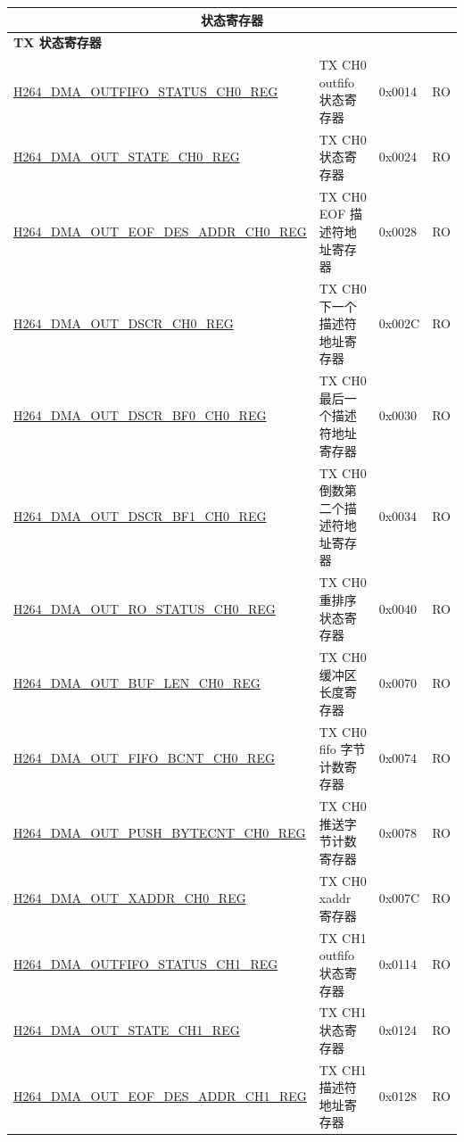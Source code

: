 \begin{longtable}{ | p{7.5cm} | p{5.7cm} | p{1.2cm} | p{1.5cm} | }
\multicolumn{4}{|c|}{\cellcolor{gray!15}\textbf{状态寄存器}} \\ \hline
\multicolumn{4}{|l|}{\textbf{TX 状态寄存器}} \\ \hline
    \hyperref[regdesc:H264DMAOUTFIFOSTATUSCH0REG]{H264\_DMA\_OUTFIFO\_STATUS\_CH0\_REG} & TX CH0 outfifo 状态寄存器 & 0x0014 & RO \\ \hline
    \hyperref[regdesc:H264DMAOUTSTATECH0REG]{H264\_DMA\_OUT\_STATE\_CH0\_REG} & TX CH0 状态寄存器 & 0x0024 & RO \\ \hline
    \hyperref[regdesc:H264DMAOUTEOFDESADDRCH0REG]{H264\_DMA\_OUT\_EOF\_DES\_ADDR\_CH0\_REG} & TX CH0 EOF 描述符地址寄存器 & 0x0028 & RO \\ \hline
    \hyperref[regdesc:H264DMAOUTDSCRCH0REG]{H264\_DMA\_OUT\_DSCR\_CH0\_REG} & TX CH0 下一个描述符地址寄存器 & 0x002C & RO \\ \hline
    \hyperref[regdesc:H264DMAOUTDSCRBF0CH0REG]{H264\_DMA\_OUT\_DSCR\_BF0\_CH0\_REG} & TX CH0 最后一个描述符地址寄存器 & 0x0030 & RO \\ \hline
    \hyperref[regdesc:H264DMAOUTDSCRBF1CH0REG]{H264\_DMA\_OUT\_DSCR\_BF1\_CH0\_REG} & TX CH0 倒数第二个描述符地址寄存器 & 0x0034 & RO \\ \hline
    \hyperref[regdesc:H264DMAOUTROSTATUSCH0REG]{H264\_DMA\_OUT\_RO\_STATUS\_CH0\_REG} & TX CH0 重排序状态寄存器 & 0x0040 & RO \\ \hline
    \hyperref[regdesc:H264DMAOUTBUFLENCH0REG]{H264\_DMA\_OUT\_BUF\_LEN\_CH0\_REG} & TX CH0 缓冲区长度寄存器 & 0x0070 & RO \\ \hline
    \hyperref[regdesc:H264DMAOUTFIFOBCNTCH0REG]{H264\_DMA\_OUT\_FIFO\_BCNT\_CH0\_REG} & TX CH0 fifo 字节计数寄存器 & 0x0074 & RO \\ \hline
    \hyperref[regdesc:H264DMAOUTPUSHBYTECNTCH0REG]{H264\_DMA\_OUT\_PUSH\_BYTECNT\_CH0\_REG} & TX CH0 推送字节计数寄存器 & 0x0078 & RO \\ \hline
    \hyperref[regdesc:H264DMAOUTXADDRCH0REG]{H264\_DMA\_OUT\_XADDR\_CH0\_REG} & TX CH0 xaddr 寄存器 & 0x007C & RO \\ \hline
    \hyperref[regdesc:H264DMAOUTFIFOSTATUSCH1REG]{H264\_DMA\_OUTFIFO\_STATUS\_CH1\_REG} & TX CH1 outfifo 状态寄存器 & 0x0114 & RO \\ \hline
    \hyperref[regdesc:H264DMAOUTSTATECH1REG]{H264\_DMA\_OUT\_STATE\_CH1\_REG} & TX CH1 状态寄存器 & 0x0124 & RO \\ \hline
    \hyperref[regdesc:H264DMAOUTEOFDESADDRCH1REG]{H264\_DMA\_OUT\_EOF\_DES\_ADDR\_CH1\_REG} & TX CH1 描述符地址寄存器 & 0x0128 & RO \\ \hline

\end{longtable}
